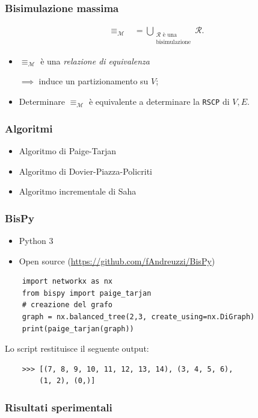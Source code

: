 \documentclass{beamer}
\begin{document}
\begin{frame}\frametitle{Bisimulazione massima}
    \begin{gather*}
        \equiv_\mathcal{M} \,\,\,\,\,= \bigcup_{\substack{\mathcal{R} \text{ è una}\\\text{bisimulazione}}} \mathcal{R}.
    \end{gather*}

    \begin{itemize}
        \item $\equiv_\mathcal{M}$ è una \emph{relazione di equivalenza}

        $\implies$ induce un partizionamento su $V$;
        \item Determinare $\equiv_\mathcal{M}$ è equivalente a determinare la \texttt{RSCP} di $V,E$.
    \end{itemize}
\end{frame}

\begin{frame}\frametitle{Algoritmi}
    \begin{itemize}
        \item Algoritmo di Paige-Tarjan
        \item Algoritmo di Dovier-Piazza-Policriti
        \item Algoritmo incrementale di Saha
    \end{itemize}
\end{frame}

\begin{frame}[fragile]\frametitle{BisPy}
    \begin{itemize}
        \item Python 3
        \item Open source (\url{https://github.com/fAndreuzzi/BisPy})
    \end{itemize}

    \begin{verbatim}
    import networkx as nx
    from bispy import paige_tarjan
    # creazione del grafo
    graph = nx.balanced_tree(2,3, create_using=nx.DiGraph)
    print(paige_tarjan(graph))
    \end{verbatim}
    Lo script restituisce il seguente output:
    \begin{verbatim}
    >>> [(7, 8, 9, 10, 11, 12, 13, 14), (3, 4, 5, 6),
        (1, 2), (0,)]
    \end{verbatim}
\end{frame}

\begin{frame}\frametitle{Risultati sperimentali}
\end{frame}
\end{document}
